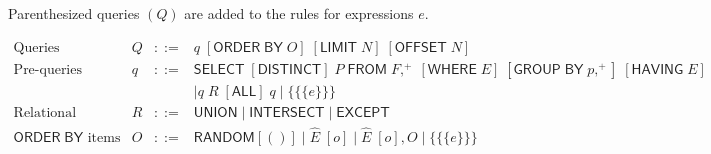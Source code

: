 \documentclass{article}
\newcommand{\mt}[1]{\mathsf{#1}}
\begin{document}
Parenthesized queries $(Q)$ are added to the rules for expressions $e$.

$$\begin{array}{rrcll}
  \textrm{Queries} & Q &::=& q \; [\mt{ORDER} \; \mt{BY} \; O] \; [\mt{LIMIT} \; N] \; [\mt{OFFSET} \; N] \\
  \textrm{Pre-queries} & q &::=& \mt{SELECT} \; [\mt{DISTINCT}] \; P \; \mt{FROM} \; F,^+ \; [\mt{WHERE} \; E] \; [\mt{GROUP} \; \mt{BY} \; p,^+] \; [\mt{HAVING} \; E] \\
  &&& \mid q \; R \; [\mt{ALL}] \; q \mid \{\{\{e\}\}\} \\
  \textrm{Relational operators} & R &::=& \mt{UNION} \mid \mt{INTERSECT} \mid \mt{EXCEPT} \\
  \textrm{$\mt{ORDER \; BY}$ items} & O &::=& \mt{RANDOM} [()] \mid \hat{E} \; [o] \mid \hat{E} \; [o], O \mid \{\{\{e\}\}\}
\end{array}$$
\end{document}
